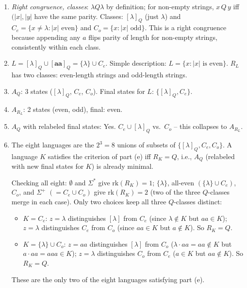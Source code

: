\begin{enumerate}[{2.}1.]
\begin{enumerate}
\item \textit{Right congruence, classes}: $\lambda Q \lambda$ by definition; for non-empty strings, $x\,Q\,y$ iff $(|x|,|y|$ have the same parity. Classes: $[\lambda]_Q$ (just $\lambda$) and $C_e=\{x\neq\lambda:|x|\text{ even}\}$ and $C_o=\{x:|x|\text{ odd}\}$. This is a right congruence because appending any $a$ flips parity of length for non-empty strings, consistently within each class.

\item $L=[\lambda]_Q\cup[\mathbf{aa}]_Q=\{\lambda\}\cup C_e$. Simple description: $L=\{x:|x|\text{ is even}\}$. $R_L$ has two classes: even-length strings and odd-length strings.

\item $A_Q$: 3 states ($[\lambda]_Q$, $C_e$, $C_o$). Final states for $L$: $\{[\lambda]_Q, C_e\}$.

\item $A_{R_L}$: 2 states (even, odd), final: even.

\item $A_Q$ with relabeled final states: Yes. $C_e\cup[\lambda]_Q$ vs.\ $C_o$ -- this collapses to $A_{R_L}$.

\item The eight languages are the $2^3=8$ unions of subsets of $\{[\lambda]_Q, C_e, C_o\}$. A language $K$ satisfies the criterion of part (e) iff $R_K = Q$, i.e., $A_Q$ (relabeled with new final states for $K$) is already minimal.

Checking all eight: $\emptyset$ and $\Sigma^*$ give $\mathrm{rk}(R_K)=1$; $\{\lambda\}$, all-even $(\{\lambda\}\cup C_e)$, $C_o$, and $\Sigma^+$ $(=C_e\cup C_o)$ give $\mathrm{rk}(R_K)=2$ (two of the three $Q$-classes merge in each case). Only two choices keep all three $Q$-classes distinct:

\begin{itemize}
\item $K = C_e$: $z=\lambda$ distinguishes $[\lambda]$ from $C_e$ (since $\lambda\notin K$ but $aa\in K$); $z=\lambda$ distinguishes $C_e$ from $C_o$ (since $aa\in K$ but $a\notin K$). So $R_K=Q$.
\item $K = \{\lambda\}\cup C_o$: $z=aa$ distinguishes $[\lambda]$ from $C_o$ ($\lambda\cdot aa=aa\notin K$ but $a\cdot aa=aaa\in K$); $z=\lambda$ distinguishes $C_o$ from $C_e$ ($a\in K$ but $aa\notin K$). So $R_K=Q$.
\end{itemize}

These are the only two of the eight languages satisfying part (e).
\end{enumerate}


\end{enumerate}

